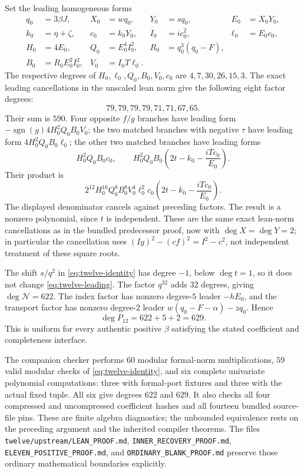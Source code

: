 Set the leading homogeneous forms
\begin{align*}
 q_0&=3\beta J,&X_0&=wq_0,&Y_0&=sq_0,&E_0&=X_0Y_0,\\
 k_0&=\eta+\zeta,&c_0&=k_0Y_0,&I_0&=ic_0^2,&\ell_0&=E_0c_0,\\
 H_0&=4E_0,&Q_0&=E_0^4I_0^2,&R_0&=q_0^3(q_0-F),\\
 B_0&=R_0E_0^2I_0^2,&V_0&=I_0T\ell_0.
\end{align*}
The respective degrees of $H_0,\ell_0,Q_0,B_0,V_0,c_0$ are
$4,7,30,26,15,3$. The exact leading cancellations in the unscaled lean
norm give the following eight factor degrees:
\[
 79,79,79,79,71,71,67,65.
\]
Their sum is $590$. Four opposite $f/g$ branches have leading form
$-\operatorname{sgn}(g)4H_0^2Q_0B_0V_0$; the two matched branches with
negative $\tau$ have leading form $4H_0^2Q_0B_0\ell_0$; the other two
matched branches have leading forms
\[
 H_0^2Q_0B_0c_0,
 \qquad
 H_0^2Q_0B_0\left(2t-k_0-\frac{iTc_0}{E_0}\right).
\]
Their product is
\begin{equation}
 2^{12}H_0^{16}Q_0^8B_0^8V_0^4\ell_0^2c_0
 \left(2t-k_0-\frac{iTc_0}{E_0}\right).
 \label{eq:twelve-leading}
\end{equation}
The displayed denominator cancels against preceding factors. The result is
a nonzero polynomial, since $t$ is independent. These are the same exact
lean-norm cancellations as in the bundled predecessor proof, now with
$\deg X=\deg Y=2$; in particular the cancellation uses
$(Ig)^2-(cf)^2=I^2-c^2$, not independent treatment of these square roots.

The shift $s/q^2$ in \eqref{eq:twelve-identity} has degree $-1$, below
$\deg t=1$, so it does not change \eqref{eq:twelve-leading}. The factor
$q^{32}$ adds $32$ degrees, giving $\deg\mathcal N=622$. The index factor
has nonzero degree-$5$ leader $-hE_0$, and the transport factor has nonzero
degree-$2$ leader $w(q_0-F-\alpha)-zq_0$. Hence
\[
 \deg P_{12}=622+5+2=629.
\]
This is uniform for every authentic positive $\beta$ satisfying the stated
coefficient and completeness interface.

The companion checker performs $60$ modular formal-norm multiplications,
$59$ valid modular checks of \eqref{eq:twelve-identity}, and six complete
univariate polynomial computations: three with formal-port fixtures and
three with the actual fixed tuple. All six give degrees $622$ and $629$.
It also checks all four compressed and uncompressed coefficient hashes and
all fourteen bundled source-file pins. These are finite algebra diagnostics;
the unbounded equivalence rests on the preceding argument and the inherited
compiler theorems. The files \texttt{twelve/upstream/LEAN\_PROOF.md},
\texttt{INNER\_RECOVERY\_PROOF.md}, \texttt{ELEVEN\_POSITIVE\_PROOF.md}, and
\texttt{ORDINARY\_BLANK\_PROOF.md} preserve those ordinary mathematical
boundaries explicitly.
